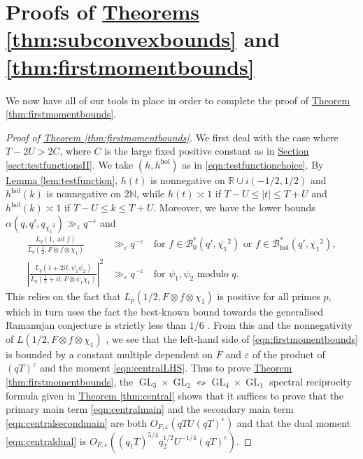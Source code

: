 \documentclass[11pt,a4paper]{amsart}
\newcommand{\BB}{\mathcal{B}}
\newcommand{\e}{\varepsilon}
\newcommand{\hol}{\mathrm{hol}}
\newcommand{\N}{\mathbb{N}}
\newcommand{\R}{\mathbb{R}}
\DeclareMathOperator{\ad}{ad}
\DeclareMathOperator{\GL}{GL}
\numberwithin{equation}{section}
\theoremstyle{remark}
\theoremstyle{definition}
\begin{document}
\section{Proofs of \texorpdfstring{\hyperref[thm:subconvexbounds]{Theorems \ref*{thm:subconvexbounds}}}{Theorems \ref{thm:subconvexbounds}} and \ref{thm:firstmomentbounds}}
\label{sect:prooffirstmoment}

We now have all of our tools in place in order to complete the proof of \hyperref[thm:firstmomentbounds]{Theorem \ref*{thm:firstmomentbounds}}.

\begin{proof}[Proof of {\hyperref[thm:firstmomentbounds]{Theorem \ref*{thm:firstmomentbounds}}}]
We first deal with the case where $T - 2U > 2C$, where $C$ is the large fixed positive constant as in \hyperref[sect:testfunctionsII]{Section \ref*{sect:testfunctionsII}}. We take $(h,h^{\hol})$ as in \eqref{eqn:testfunctionchoice}. By \hyperref[lem:testfunction]{Lemma \ref*{lem:testfunction}}, $h(t)$ is nonnegative on $\R \cup i(-1/2,1/2)$ and $h^{\hol}(k)$ is nonnegative on $2\N$, while $h(t) \asymp 1$ if $T - U \leq |t| \leq T + U$ and $h^{\hol}(k) \asymp 1$ if $T - U \leq k \leq T + U$. Moreover, we have the lower bounds $\alpha(q,q',q_{\overline{\chi_1}^2}) \gg_{\e} q^{-\e}$ and 
\begin{align*}
\frac{L_q(1,\ad f)}{L_q\left(\frac{1}{2},F \otimes f \otimes \chi_1\right)} & \gg_{\e} q^{-\e} \quad \text{for $f \in \BB_0^{\ast}(q',\overline{\chi_1}^2)$ or $f \in \BB_{\hol}^{\ast}(q',\overline{\chi_1}^2)$},	\\
\left|\frac{L_q(1 + 2it,\psi_1\overline{\psi_2})}{L_q\left(\frac{1}{2} + it,F \otimes \psi_1 \chi_1\right)}\right|^2 & \gg_{\e} q^{-\e} \quad \text{for $\psi_1,\psi_2$ modulo $q$}.
\end{align*}
This relies on the fact that $L_p(1/2,F \otimes f \otimes \chi_1)$ is positive for all primes $p$, which in turn uses the fact the best-known bound towards the generalised Ramanujan conjecture is strictly less than $1/6$ \cite{Kim03}. From this and the nonnegativity of $L(1/2,F \otimes f \otimes \chi_1)$ \cite[Theorem 1.1]{Lap03}, we see that the left-hand side of \eqref{eqn:firstmomentbounds} is bounded by a constant multiple dependent on $F$ and $\e$ of the product of $(qT)^{\e}$ and the moment \eqref{eqn:centralLHS}. Thus to prove \hyperref[thm:firstmomentbounds]{Theorem \ref*{thm:firstmomentbounds}}, the $\GL_3 \times \GL_2 \leftrightsquigarrow \GL_4 \times \GL_1$ spectral reciprocity formula given in \hyperref[thm:central]{Theorem \ref*{thm:central}} shows that it suffices to prove that the primary main term \eqref{eqn:centralmain} and the secondary main term \eqref{eqn:centralsecondmain} are both $O_{F,\e} (q TU (qT)^{\e})$ and that the dual moment \eqref{eqn:centraldual} is $O_{F,\e}((q_1 T)^{5/4} q_2^{1/2} U^{-1/4} (qT)^{\e})$.


\end{proof}
\end{document}
